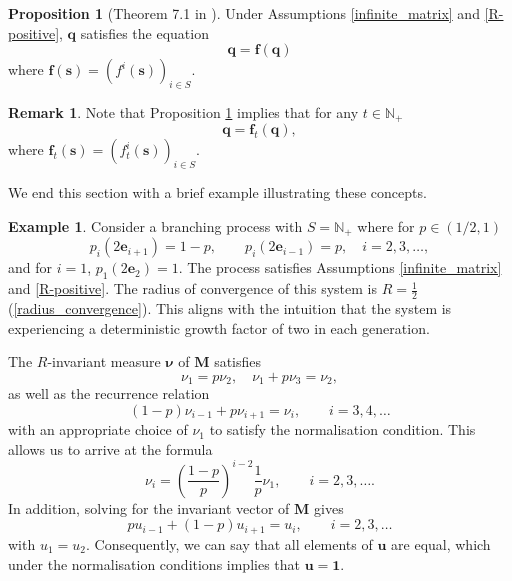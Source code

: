 \documentclass[preprint,3p,12pt]{elsarticle}
\theoremstyle{definition}
\newtheorem{example}{Example}
\newtheorem{proposition}{Proposition}
\newtheorem*{remark}{Remark}
\begin{document}
    \begin{proposition}[Theorem 7.1 in \cite{harris1963}]\label{prop:compute_extinct}
        Under Assumptions \ref{infinite_matrix} and \ref{R-positive}, $\boldsymbol{q}$ satisfies the equation
\begin{equation*}
\boldsymbol{q} = \boldsymbol{f}(\boldsymbol{q})
\end{equation*}
where $\boldsymbol{f}(\boldsymbol{s})=(f^i(\boldsymbol{s}))_{i \in S}$.
    \end{proposition}
    \begin{remark}
        Note that Proposition \ref{prop:compute_extinct} implies that for any $t \in \mathbb{N}_+$
        \begin{equation*}
            \boldsymbol{q} = \boldsymbol{f}_t(\boldsymbol{q}),
        \end{equation*}
        where $\boldsymbol{f}_t(\boldsymbol{s})=(f^i_t(\boldsymbol{s}))_{i \in S}$.
    \end{remark}

We end this section with a brief example illustrating these concepts.   
\begin{example}\label{deterministic2}
    Consider a branching process with $S=\mathbb{N}_+$ where for $p \in (1/2, 1)$
    \begin{equation*}
        p_i(2\boldsymbol{e}_{i+1}) = 1-p, \qquad p_i(2\boldsymbol{e}_{i-1}) = p, \quad i = 2,3,\dots,
    \end{equation*}
    and for $i=1$, $ p_1(2\boldsymbol{e}_2) = 1$. The process satisfies Assumptions \ref{infinite_matrix} and \ref{R-positive}. The radius of convergence of this system is $R=\tfrac{1}{2}$ (\ref{radius_convergence}). This aligns with the intuition that the system is experiencing a deterministic growth factor of two in each generation.

The $R$-invariant measure $\boldsymbol{\nu}$ of $\boldsymbol{M}$ satisfies 
\begin{equation*}
    \nu_1 = p\nu_2, \quad \nu_1 + p \nu_3 = \nu_2,
\end{equation*}
as well as the recurrence relation
\begin{equation*}
    (1-p)\nu_{i-1} + p \nu_{i+1} = \nu_i, \qquad i=3,4,\dots
\end{equation*}
with an appropriate choice of $\nu_1$ to satisfy the normalisation condition. 
This allows us to arrive at the formula
\begin{equation*}
    \nu_i =\left(\frac{1-p}{p}\right)^{i-2}\frac{1}{p} \nu_1, \qquad i=2,3,\dots.
\end{equation*}
In addition, solving for the invariant vector of $\boldsymbol{M}$ gives 
\begin{equation}
p u_{i-1}+ (1-p)u_{i+1} = u_i, \qquad i=2,3,\dots
\end{equation}
with $u_1=u_2$. Consequently, we can say that all elements of $\boldsymbol{u}$ are equal, which under the normalisation conditions implies that $\boldsymbol{u}=\boldsymbol{1}$. 
\end{example}
\end{document}

